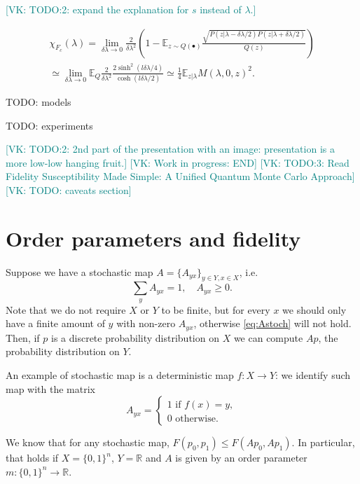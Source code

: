 \documentclass[american,aps,pra,reprint,floatfix,nofootinbib,superscriptaddress]{revtex4-2}
\newcommand{\VK}[1]{\textcolor{teal}{[VK: #1]}}
\begin{document}
\VK{TODO:2: expand the explanation for $s$ instead of $\lambda$.}

    \begin{multline*}
      \chi_{F_c}(\lambda) = \lim_{\delta \lambda\to 0} \frac2{\delta \lambda^2} \left(1 - \mathbb{E}_{z\sim Q(\bullet)} \frac{\sqrt{P(z|\lambda-\delta \lambda/2)P(z|\lambda+\delta \lambda/2)}}{Q(z)}\right)
      \\ \simeq \lim_{\delta \lambda\to 0} \mathbb{E}_{Q}\frac2{\delta \lambda^2}\frac{2\sinh^2(l\delta \lambda/4)}{\cosh(l\delta \lambda/2)} \simeq \frac14 \mathbb{E}_{z|\lambda} M(\lambda, 0, z)^2.
    \end{multline*}

TODO: models

TODO: experiments

\VK{TODO:2: 2nd part of the presentation with an image: presentation is a more low-low hanging fruit.}
\VK{Work in progress: END}
\VK{TODO:3: Read Fidelity Susceptibility Made Simple: A Unified Quantum Monte Carlo Approach}
\VK{TODO: caveats section}

\section{Order parameters and fidelity}
Suppose we have a stochastic map $A = \{A_{yx}\}_{y\in Y, x\in X}$, i.e.
\begin{equation}
  \label{eq:Astoch}
  \sum_{y} A_{yx} = 1, \quad A_{yx} \geq 0.
\end{equation}
Note that we do not require $X$ or $Y$ to be finite, but
for every $x$ we should only have a finite amount of $y$ with non-zero $A_{yx}$,
otherwise \eqref{eq:Astoch} will not hold.
Then, if $p$ is a discrete probability distribution on $X$ we can
compute $Ap$, the probability distribution on $Y$.

An example of stochastic map is a deterministic map $f: X \to Y$:
we identify such map with the matrix
\begin{equation}
  A_{yx} =
  \begin{cases}
    1 \text{ if } f(x) = y,\\
    0 \text{ otherwise.}
  \end{cases}
\end{equation}

We know that for any stochastic map, $F(p_0, p_1) \leq F(Ap_0, Ap_1)$.
In particular, that holds if $X = \{0, 1\}^n$, $Y = \mathbb{R}$ and
$A$ is given by an order parameter $m\colon \{0, 1\}^n \to \mathbb{R}$.
\end{document}
